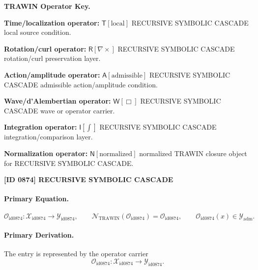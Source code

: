 \par\vspace{0.45\baselineskip}
\noindent\begin{minipage}[t]{\linewidth}
\begingroup
\small
\raggedright
\textbf{TRAWIN Operator Key.}\par
\noindent\textbf{Time/localization operator:} $\mathsf{T}\!\left[\mathrm{local}\right]$ RECURSIVE SYMBOLIC CASCADE local source condition.\par
\noindent\textbf{Rotation/curl operator:} $\mathsf{R}\!\left[\nabla\times\right]$ RECURSIVE SYMBOLIC CASCADE rotation/curl preservation layer.\par
\noindent\textbf{Action/amplitude operator:} $\mathsf{A}\!\left[\mathrm{admissible}\right]$ RECURSIVE SYMBOLIC CASCADE admissible action/amplitude condition.\par
\noindent\textbf{Wave/d'Alembertian operator:} $\mathsf{W}\!\left[\Box\right]$ RECURSIVE SYMBOLIC CASCADE wave or operator carrier.\par
\noindent\textbf{Integration operator:} $\mathsf{I}\!\left[\int\right]$ RECURSIVE SYMBOLIC CASCADE integration/comparison layer.\par
\noindent\textbf{Normalization operator:} $\mathsf{N}\!\left[\mathrm{normalized}\right]$ normalized TRAWIN closure object for RECURSIVE SYMBOLIC CASCADE.\par
\endgroup
\end{minipage}

\clearpage
\noindent\textbf{[ID 0874] RECURSIVE SYMBOLIC CASCADE}\par
\vspace{0.35em}
\paragraph{Primary Equation.}
\[
\mathcal{O}_{\mathrm{id0874}}:\mathcal{X}_{\mathrm{id0874}}\longrightarrow \mathcal{Y}_{\mathrm{id0874}},\qquad
\mathcal{N}_{\mathrm{TRAWIN}}(\mathcal{O}_{\mathrm{id0874}})=\mathcal{O}_{\mathrm{id0874}},\qquad
\mathcal{O}_{\mathrm{id0874}}(x)\in\mathcal{Y}_{\mathrm{adm}}.
\]

\paragraph{Primary Derivation.} The entry is represented by the operator carrier\[
\mathcal{O}_{\mathrm{id0874}}:\mathcal{X}_{\mathrm{id0874}}\longrightarrow \mathcal{Y}_{\mathrm{id0874}}.
\]

